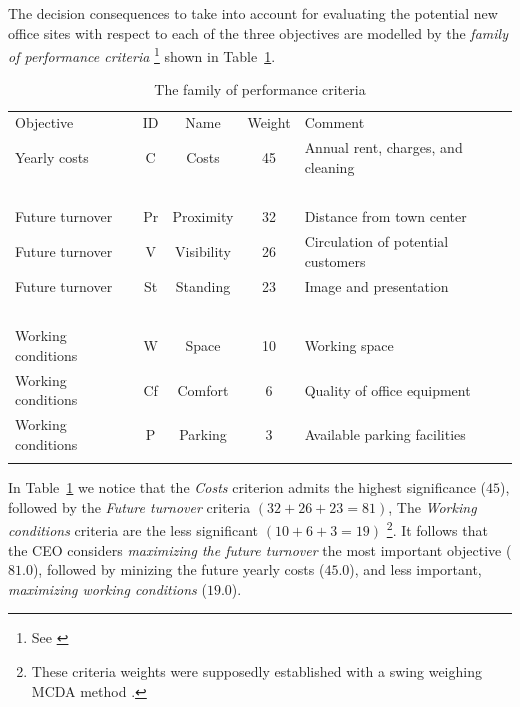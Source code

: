 The decision consequences to take into account for evaluating the potential new office sites with respect to each of the three objectives are modelled by the \emph{family of performance criteria} \footnote{See \citealp{ROY-2000}} shown in Table~\ref{tab:4.2}.
\begin{table}[h]
\caption{The family of performance criteria}
\label{tab:4.2}       %
\begin{center}
    \begin{tabular}{l|c|c|c|l}
      \svhline\noalign{\smallskip}
      Objective & ID & Name & Weight & Comment\\
      \noalign{\smallskip}\hline\noalign{\smallskip}
    Yearly costs  &       C &   Costs &  45 &     Annual rent, charges, and cleaning\\
    \             &  \      & \        &  \ & \ \\
    Future turnover   &   Pr  & Proximity  & 32 & Distance from town center\\
    Future turnover   &   V  &  Visibility & 26 & Circulation of potential customers \\
    Future turnover   &   St &   Standing & 23 &   Image and presentation\\
    \                 &   \   & \          &  \ & \  \\
    Working conditions &  W  &  Space   &   10 &  Working space\\
    Working conditions &  Cf &  Comfort  &  6 &  Quality of office equipment\\
    Working conditions &  P  &  Parking  &  3 &  Available parking facilities\\
      \noalign{\smallskip}\hline
    \end{tabular}   
  \end{center}
\end{table}

In Table~\ref{tab:4.2} we notice that the \emph{Costs} criterion admits the highest significance ($45$), followed by the \emph{Future turnover} criteria $(32 + 26 + 23 = 81)$, The \emph{Working conditions} criteria are the less significant $(10 + 6 + 3 = 19)$ \footnote{These criteria weights were supposedly established with a swing weighing MCDA method \citep{KEE-1976}.}. It follows that the CEO considers \emph{maximizing the future turnover} the most important objective ($81.0$), followed by minizing the future yearly costs ($45.0$), and less important, \emph{maximizing working conditions} ($19.0$). 

